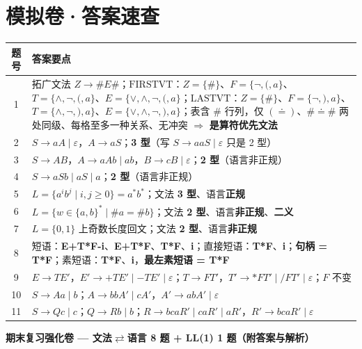 \documentclass[12pt,a4paper,fontset=windows]{ctexart}
\newcommand{\FVname}{\ensuremath{\mathrm{FIRSTVT}}}
\newcommand{\LVname}{\ensuremath{\mathrm{LASTVT}}}
\newcommand{\imp}{\ensuremath{\Rightarrow}}
\begin{document}
\section{模拟卷·答案速查}

\begin{center}
\renewcommand{\arraystretch}{1.3}
\setlength{\tabcolsep}{6pt}
\begin{tabular}{@{}c p{13.6cm}@{}}
\toprule
\textbf{题号} & \textbf{答案要点} \\
\midrule
1 & 拓广文法 $Z \to \#E\#$；\FVname{}：$Z=\{\#\}$、$F=\{\neg,(,a\}$、$T=\{\wedge,\neg,(,a\}$、$E=\{\vee,\wedge,\neg,(,a\}$；\LVname{}：$Z=\{\#\}$、$F=\{\neg,),a\}$、$T=\{\wedge,\neg,),a\}$、$E=\{\vee,\wedge,\neg,),a\}$；表含 $\#$ 行列，仅 $( \doteq )$、$\# \doteq \#$ 两处同级、每格至多一种关系、无冲突 \imp{} \textbf{是算符优先文法} \\
2 & $S \to aA \mid \varepsilon$，$A \to aS$；\textbf{3 型}（写 $S \to aaS \mid \varepsilon$ 只是 2 型） \\
3 & $S \to AB$，$A \to aAb \mid ab$，$B \to cB \mid \varepsilon$；\textbf{2 型}（语言非正规） \\
4 & $S \to aSb \mid aS \mid a$；\textbf{2 型}（语言非正规） \\
5 & $L = \{a^i b^j \mid i,j \ge 0\} = a^* b^*$；文法 \textbf{3 型}、语言\textbf{正规} \\
6 & $L = \{w \in \{a,b\}^* \mid \#a = \#b\}$；文法 \textbf{2 型}、语言\textbf{非正规}、\textbf{二义} \\
7 & $L=\{0,1\}$ 上奇数长度回文；文法 \textbf{2 型}、语言\textbf{非正规} \\
8 & 短语：\textbf{E+T*F-i}、\textbf{E+T*F}、\textbf{T*F}、\textbf{i}；直接短语：\textbf{T*F}、\textbf{i}；\textbf{句柄 = T*F}；素短语：\textbf{T*F}、\textbf{i}，\textbf{最左素短语 = T*F} \\
9 & $E \to TE'$，$E' \to {+}TE' \mid {-}TE' \mid \varepsilon$；$T \to FT'$，$T' \to {*}FT' \mid /FT' \mid \varepsilon$；$F$ 不变 \\
10 & $S \to Aa \mid b$；$A \to bbA' \mid cA'$，$A' \to abA' \mid \varepsilon$ \\
11 & $S \to Qc \mid c$；$Q \to Rb \mid b$；$R \to bcaR' \mid caR' \mid aR'$，$R' \to bcaR' \mid \varepsilon$ \\
\bottomrule
\end{tabular}
\end{center}

\newpage
\begin{center}
{\LARGE\bfseries 期末复习强化卷 — 文法$\rightleftarrows$语言 8 题 + LL(1) 1 题（附答案与解析）}
\end{center}
\end{document}
